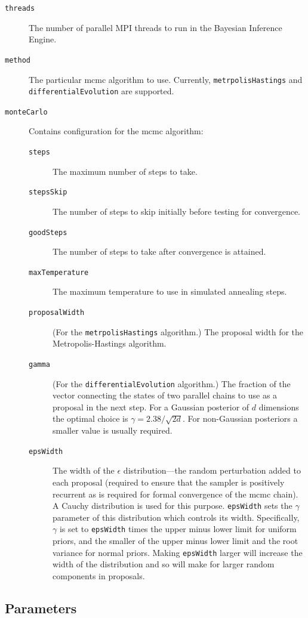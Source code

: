 \begin{description}
 \item [{\tt threads}] The number of parallel MPI threads to run in the Bayesian Inference Engine.
 \item [{\tt method}] The particular \gls{mcmc} algorithm to use. Currently, {\tt metrpolisHastings} and {\tt differentialEvolution} are supported.
 \item [{\tt monteCarlo}] Contains configuration for the \gls{mcmc} algorithm:
 \begin{description}
  \item [{\tt steps}] The maximum number of steps to take.
  \item [{\tt stepsSkip}] The number of steps to skip initially before testing for convergence.
  \item [{\tt goodSteps}] The number of steps to take after convergence is attained.
  \item [{\tt maxTemperature}] The maximum temperature to use in simulated annealing steps.
  \item [{\tt proposalWidth}] (For the {\tt metrpolisHastings} algorithm.) The proposal width for the Metropolis-Hastings algorithm. 
  \item [{\tt gamma}] (For the {\tt differentialEvolution} algorithm.) The fraction of the vector connecting the states of two parallel chains to use as a proposal in the next step. For a Gaussian posterior of $d$ dimensions the optimal choice is $\gamma = 2.38/\sqrt{2 d}$. For non-Gaussian posteriors a smaller value is usually required.
  \item [{\tt epsWidth}] The width of the $\epsilon$ distribution---the random perturbation added to each proposal (required to ensure that the sampler is positively recurrent as is required for formal convergence of the \gls{mcmc} chain). A Cauchy distribution is used for this purpose. {\tt epsWidth} sets the $\gamma$ parameter of this distribution which controls its width. Specifically, $\gamma$ is set to {\tt epsWidth} times the upper minus lower limit for uniform priors, and the smaller of the upper minus lower limit and the root variance for normal priors. Making {\tt epsWidth} larger will increase the width of the distribution and so will make for larger random components in proposals.
 \end{description}
\end{description}


\subsection{Parameters}

